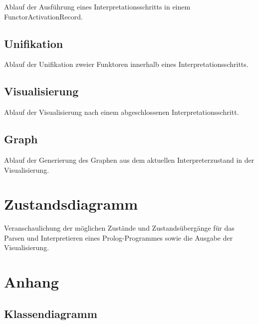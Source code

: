 \documentclass[parskip=full,11pt,twoside]{scrartcl}
\begin{document}
Ablauf der Ausführung eines Interpretationsschritts in einem FunctorActivationRecord.

\subsection{Unifikation}

Ablauf der Unifikation zweier Funktoren innerhalb eines Interpretationsschritts.

\subsection{Visualisierung}

Ablauf der Visualisierung nach einem abgeschlossenen Interpretationsschritt. 

\subsection{Graph}

Ablauf der Generierung des Graphen aus dem aktuellen Interpreterzustand in der Visualisierung.

\section{Zustandsdiagramm}

Veranschaulichung der möglichen Zustände und Zustandsübergänge für das Parsen und Interpretieren eines Prolog-Programmes sowie die Ausgabe der Visualisierung.

\appendix

\section{Anhang}

\subsection{Klassendiagramm}
\end{document}
